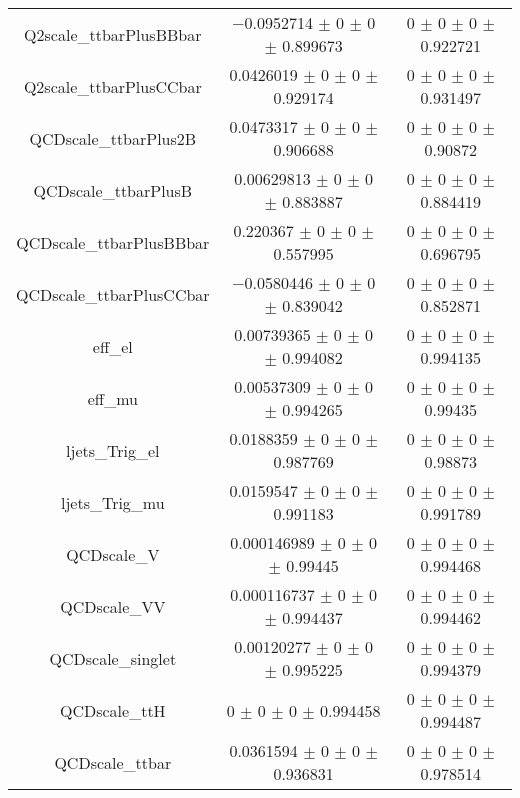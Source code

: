 \begin{table}
\begin{tabular}{ccc}
Q2scale\_ttbarPlusBBbar & \num{-0.0952714} $\pm$ \num{0} $\pm$ \num{0} $\pm$ \num{0.899673} & \num{0} $\pm$ \num{0} $\pm$ \num{0} $\pm$ \num{0.922721}\\
Q2scale\_ttbarPlusCCbar & \num{0.0426019} $\pm$ \num{0} $\pm$ \num{0} $\pm$ \num{0.929174} & \num{0} $\pm$ \num{0} $\pm$ \num{0} $\pm$ \num{0.931497}\\
QCDscale\_ttbarPlus2B & \num{0.0473317} $\pm$ \num{0} $\pm$ \num{0} $\pm$ \num{0.906688} & \num{0} $\pm$ \num{0} $\pm$ \num{0} $\pm$ \num{0.90872}\\
QCDscale\_ttbarPlusB & \num{0.00629813} $\pm$ \num{0} $\pm$ \num{0} $\pm$ \num{0.883887} & \num{0} $\pm$ \num{0} $\pm$ \num{0} $\pm$ \num{0.884419}\\
QCDscale\_ttbarPlusBBbar & \num{0.220367} $\pm$ \num{0} $\pm$ \num{0} $\pm$ \num{0.557995} & \num{0} $\pm$ \num{0} $\pm$ \num{0} $\pm$ \num{0.696795}\\
QCDscale\_ttbarPlusCCbar & \num{-0.0580446} $\pm$ \num{0} $\pm$ \num{0} $\pm$ \num{0.839042} & \num{0} $\pm$ \num{0} $\pm$ \num{0} $\pm$ \num{0.852871}\\
eff\_el & \num{0.00739365} $\pm$ \num{0} $\pm$ \num{0} $\pm$ \num{0.994082} & \num{0} $\pm$ \num{0} $\pm$ \num{0} $\pm$ \num{0.994135}\\
eff\_mu & \num{0.00537309} $\pm$ \num{0} $\pm$ \num{0} $\pm$ \num{0.994265} & \num{0} $\pm$ \num{0} $\pm$ \num{0} $\pm$ \num{0.99435}\\
ljets\_Trig\_el & \num{0.0188359} $\pm$ \num{0} $\pm$ \num{0} $\pm$ \num{0.987769} & \num{0} $\pm$ \num{0} $\pm$ \num{0} $\pm$ \num{0.98873}\\
ljets\_Trig\_mu & \num{0.0159547} $\pm$ \num{0} $\pm$ \num{0} $\pm$ \num{0.991183} & \num{0} $\pm$ \num{0} $\pm$ \num{0} $\pm$ \num{0.991789}\\
QCDscale\_V & \num{0.000146989} $\pm$ \num{0} $\pm$ \num{0} $\pm$ \num{0.99445} & \num{0} $\pm$ \num{0} $\pm$ \num{0} $\pm$ \num{0.994468}\\
QCDscale\_VV & \num{0.000116737} $\pm$ \num{0} $\pm$ \num{0} $\pm$ \num{0.994437} & \num{0} $\pm$ \num{0} $\pm$ \num{0} $\pm$ \num{0.994462}\\
QCDscale\_singlet & \num{0.00120277} $\pm$ \num{0} $\pm$ \num{0} $\pm$ \num{0.995225} & \num{0} $\pm$ \num{0} $\pm$ \num{0} $\pm$ \num{0.994379}\\
QCDscale\_ttH & \num{0} $\pm$ \num{0} $\pm$ \num{0} $\pm$ \num{0.994458} & \num{0} $\pm$ \num{0} $\pm$ \num{0} $\pm$ \num{0.994487}\\
QCDscale\_ttbar & \num{0.0361594} $\pm$ \num{0} $\pm$ \num{0} $\pm$ \num{0.936831} & \num{0} $\pm$ \num{0} $\pm$ \num{0} $\pm$ \num{0.978514}\\

\end{tabular}
\end{table}
